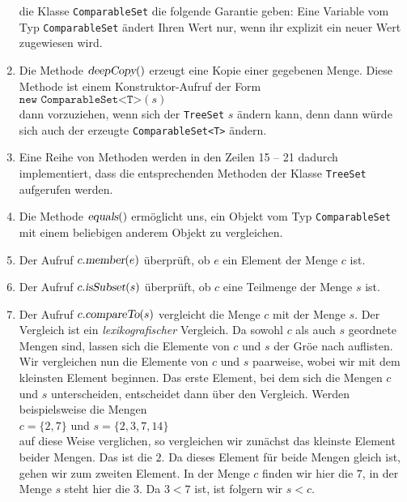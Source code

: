 \begin{enumerate}
      die Klasse \texttt{ComparableSet} die folgende Garantie geben: Eine Variable vom Typ
      \texttt{ComparableSet} \"andert Ihren Wert nur, wenn ihr explizit ein neuer Wert zugewiesen wird.
\item Die Methode $\textsl{deepCopy}()$ erzeugt eine Kopie einer gegebenen Menge.  Diese Methode ist
      einem Konstruktor-Aufruf der Form
      \\[0.2cm]
      \hspace*{1.3cm}
      $\texttt{new ComparableSet<T>}(s)$
      \\[0.2cm]
      dann vorzuziehen, wenn sich der \texttt{TreeSet} $s$ \"andern kann, denn dann w\"urde sich auch der
      erzeugte \texttt{ComparableSet<T>} \"andern.
\item Eine Reihe von Methoden werden in den Zeilen 15 -- 21 dadurch implementiert, dass
      die entsprechenden Methoden der Klasse \texttt{TreeSet} aufgerufen werden.
\item Die Methode $\textsl{equals}()$ erm\"oglicht uns, ein Objekt vom Typ
      \texttt{ComparableSet} mit einem beliebigen anderem Objekt zu vergleichen.
\item Der Aufruf $c.\textsl{member}(e)$ \"uberpr\"uft, ob $e$ ein Element der Menge $c$ ist.
\item Der Aufruf $c.\textsl{isSubset}(s)$ \"uberpr\"uft, ob $c$ eine Teilmenge der Menge $s$ ist.
\item Der Aufruf $c.\textsl{compareTo}(s)$ vergleicht die Menge $c$ mit der Menge $s$.
      Der Vergleich ist ein \emph{lexikografischer} Vergleich.  Da sowohl $c$ als auch $s$
      geordnete Mengen sind, lassen sich die Elemente von $c$ und $s$ der Gr\"o\3e nach
      auflisten.  Wir vergleichen nun die Elemente von $c$ und $s$ paarweise, wobei wir
      mit dem kleinsten Element beginnen.  Das erste Element, bei dem sich die Mengen $c$
      und $s$ unterscheiden, entscheidet dann \"uber den Vergleich.
      Werden beispielsweise die Mengen
      \\[0.2cm]
      \hspace*{1.3cm}
      $c = \{ 2, 7 \}$ \quad und \quad $s = \{ 2, 3, 7, 14 \}$
      \\[0.2cm]
      auf diese Weise verglichen, so vergleichen wir zun\"achst das kleinste Element
      beider Mengen.  Das ist die $2$.  Da dieses Element f\"ur beide Mengen gleich ist,
      gehen wir zum zweiten Element.  In der Menge $c$ finden wir hier die $7$, in der
      Menge $s$ steht hier die $3$.  Da $3 < 7$ ist, ist folgern wir $s < c$.


\end{enumerate}
